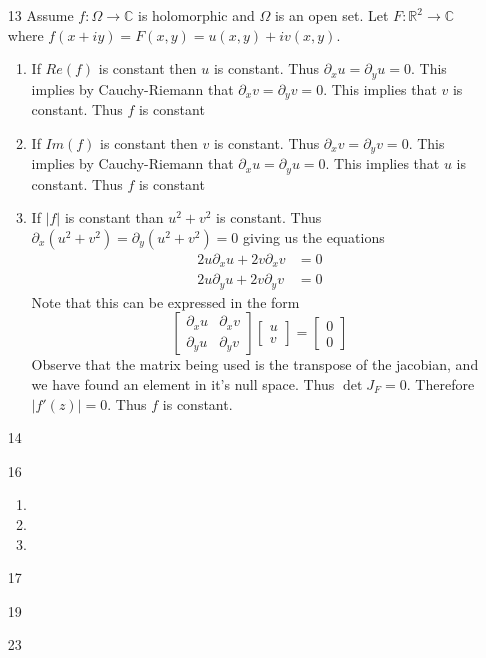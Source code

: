 \documentclass[12pt, letterpaper]{article}
\newcommand{\R}{\mathbb{R}}
\newcommand{\C}{\mathbb{C}}
\begin{document}
\begin{enumerate}
	\item[13] Assume $f: \Omega \to \C$ is holomorphic and $\Omega$ is an open set.  Let $F:\R^2 \to \C$ where 
	$f(x+iy) = F(x,y) = u(x,y) + i v(x,y)$.
	\begin{enumerate}
		\item If $Re(f)$ is constant then $u$ is constant.  Thus $\partial_x u = \partial_y u = 0$.  This implies by 
		Cauchy-Riemann that $\partial_x v = \partial_y v = 0$.  This implies that $v$ is constant.  Thus $f$ is constant
		\item If $Im(f)$ is constant then $v$ is constant.  Thus $\partial_x v = \partial_y v = 0$.  This implies by 
		Cauchy-Riemann that $\partial_x u = \partial_y u = 0$.  This implies that $u$ is constant.  Thus $f$ is constant
		\item If $|f|$ is constant than $u^2 + v^2$ is constant.  Thus $\partial_x(u^2 + v^2) = \partial_y(u^2 + v^2) = 0$ giving us the equations 
		\begin{align*}
		2 u \partial_x u + 2 v \partial_x v &= 0\\
		2 u \partial_y u + 2 v \partial_y v &= 0
		\end{align*}
		Note that this can be expressed in the form 
$$		
		\begin{bmatrix}
		\partial_x u & \partial_x v\\
		\partial_y u & \partial_y v
		\end{bmatrix}
		\begin{bmatrix}
		u\\ v
		\end{bmatrix}
		= 
		\begin{bmatrix}
		0\\0
		\end{bmatrix}
$$
	Observe that the matrix being used is the transpose of the jacobian, and we have found an element in it's null space.
	Thus $\det J_F = 0$.  Therefore $|f'(z)| = 0$.  Thus $f$ is constant.  
	\end{enumerate}
	\item[14]
	\item[16]
	\begin{enumerate}
		\item
		\item
		\item
	\end{enumerate}
	\item[17]
	\item[19]
	\item[23]
\end{enumerate}
\end{document}

